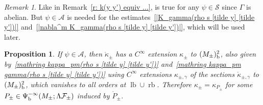 \documentclass{memo-l}
\theoremstyle{plain}
\newtheorem{prop}[thm]{Proposition}
\theoremstyle{definition}
\theoremstyle{remark}
\newtheorem{rem}[thm]{Remark}
\renewcommand{\AA}{\mathcal{A}}
\newcommand{\FF}{\mathcal{F}}
\renewcommand{\SS}{\mathcal{S}}
\newcommand{\lb}{\operatorname{lb}}
\newcommand{\rb}{\operatorname{rb}}
\newcommand{\Psib}{\Psi_{\text{\rm b}}}
\numberwithin{section}{chapter}
\numberwithin{equation}{section}%
\begin{document}
\begin{rem}
Like in Remark~\ref{r: k(y y') equiv ...},  is true for any $\psi\in\SS$ since $\Gamma$ is abelian. But $\psi\in\AA$ is needed for the estimates~\eqref{|K_gamma(rho s [tilde y] [tilde y'])|} and~\eqref{|nabla^m K_gamma(rho s [tilde y] [tilde y'])|}, which will be used later. 
\end{rem}

\begin{prop}\label{p: kappa_P_pm}
If $\psi\in\AA$, then $\mathring\kappa_\pm$ has a $C^\infty$ extension $\kappa_\pm$ to $(M_\pm)^2_{\text{\rm b}}$, also given by~\eqref{mathring kappa_pm(rho s [tilde y] [tilde y'])} and~\eqref{mathring kappa_pm gamma(rho s [tilde y] [tilde y'])} using $C^\infty$ extensions $\kappa_{\pm,\gamma}$ of the sections $\mathring\kappa_{\pm,\gamma}$ to $(M_\pm)^2_{\text{\rm b}}$, which vanishes to all orders at $\lb\cup\rb$. Therefore $\kappa_\pm=\kappa_{P_\pm}$ for some $P_\pm\in\Psib^{-\infty}(M_\pm;\Lambda\FF_\pm)$ induced by $\mathring P_\pm$.
\end{prop}
\end{document}
